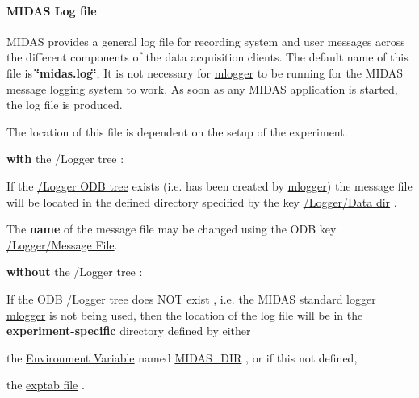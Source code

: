 \par
 \label{F_Messaging_idx_message_log-file}
\hypertarget{F_Messaging_idx_message_log-file}{}
 

 \hypertarget{F_Messaging_F_Log_File}{}\paragraph{MIDAS Log file}\label{F_Messaging_F_Log_File}
MIDAS provides a general log file for recording system and user messages across the different components of the data acquisition clients. The default name of this file is {\bfseries \char`\"{}midas.log\char`\"{}}, It is not necessary for \hyperlink{F_Logging_F_mlogger_utility}{mlogger} to be running for the MIDAS message logging system to work. As soon as any MIDAS application is started, the log file is produced. \par
 \label{F_Messaging_idx_message_log-file_location}
\hypertarget{F_Messaging_idx_message_log-file_location}{}
 The location of this file is dependent on the setup of the experiment.


\begin{DoxyItemize}
\item {\bfseries with} the /Logger tree :
\begin{DoxyItemize}
\item If the \hyperlink{F_Logging_Data_F_Logger_tree}{/Logger ODB tree} exists (i.e. has been created by \hyperlink{F_Logging_F_mlogger_utility}{mlogger}) the message file will be located in the defined directory specified by the key \hyperlink{F_Logging_Data_F_Logger_Data_Dir}{/Logger/Data dir} .
\item The {\bfseries name} of the message file may be changed using the ODB key \hyperlink{F_Logging_Data_F_Logger_Message_File}{/Logger/Message File}.
\end{DoxyItemize}
\end{DoxyItemize}


\begin{DoxyItemize}
\item {\bfseries without} the /Logger tree :
\begin{DoxyItemize}
\item If the ODB /Logger tree does NOT exist , i.e. the MIDAS standard logger \hyperlink{F_Logging_F_mlogger_utility}{mlogger} is not being used, then the location of the log file will be in the {\bfseries  experiment-\/specific } directory defined by either
\begin{DoxyItemize}
\item the \hyperlink{BuildingOptions_BO_Environment_variables}{Environment Variable} named \hyperlink{BuildingOptions_BO_MIDAS_DIR}{MIDAS\_\-DIR} , or if this not defined,
\item the \hyperlink{Q_Linux_Q_Linux_Exptab}{exptab file} .
\end{DoxyItemize}
\end{DoxyItemize}
\end{DoxyItemize}

